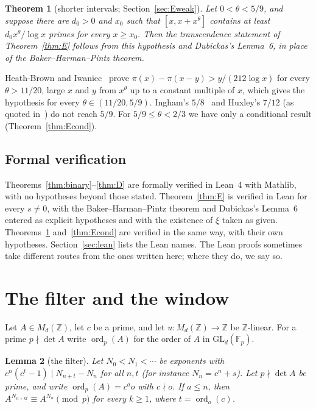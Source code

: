 \documentclass[11pt]{amsart}
\newtheorem{theorem}{Theorem}[section]
\newtheorem{lemma}[theorem]{Lemma}
\theoremstyle{definition}
\newcommand{\Z}{\mathbb{Z}}
\newcommand{\F}{\mathbb{F}}
\newcommand{\GL}{\mathrm{GL}}
\newcommand{\ord}{\operatorname{ord}}
\begin{document}
\begin{theorem}[shorter intervals; Section~\ref{sec:Eweak}]\label{thm:Eweak}
Let $0<\theta<5/9$, and suppose there are $d_0>0$ and $x_0$ such that $[x,x+x^\theta]$ contains at least $d_0x^\theta/\log x$ primes for every $x\ge x_0$.  Then the transcendence statement of Theorem~\ref{thm:E} follows from this hypothesis and Dubickas's Lemma~6, in place of the Baker--Harman--Pintz theorem.
\end{theorem}

Heath-Brown and Iwaniec~\cite{HBI79} prove $\pi(x)-\pi(x-y)>y/(212\log x)$ for every $\theta>11/20$, large $x$ and $y$ from $x^\theta$ up to a constant multiple of $x$, which gives the hypothesis for every $\theta\in(11/20,5/9)$.  Ingham's $5/8$~\cite{Ing37} and Huxley's $7/12$ (as quoted in~\cite{HBI79}) do not reach $5/9$.  For $5/9\le\theta<2/3$ we have only a conditional result (Theorem~\ref{thm:Econd}).

\subsection*{Formal verification}
Theorems~\ref{thm:binary}--\ref{thm:D} are formally verified in Lean~4 with Mathlib, with no hypotheses beyond those stated.  Theorem~\ref{thm:E} is verified in Lean for every $s\neq0$, with the Baker--Harman--Pintz theorem and Dubickas's Lemma~6 entered as explicit hypotheses and with the existence of $\xi$ taken as given.  Theorems~\ref{thm:Eweak} and~\ref{thm:Econd} are verified in the same way, with their own hypotheses.  Section~\ref{sec:lean} lists the Lean names.  The Lean proofs sometimes take different routes from the ones written here; where they do, we say so.

\section{The filter and the window}\label{sec:filter}

Let $A\in M_d(\Z)$, let $c$ be a prime, and let $u:M_d(\Z)\to\Z$ be $\Z$-linear.  For a prime $p\nmid\det A$ write $\ord_p(A)$ for the order of $A$ in $\GL_d(\F_p)$.

\begin{lemma}[the filter]\label{lem:filter}
Let $N_0<N_1<\cdots$ be exponents with $c^{n}(c^{t}-1)\mid N_{n+t}-N_n$ for all $n,t$ (for instance $N_n=c^n+s$).  Let $p\nmid\det A$ be prime, and write $\ord_p(A)=c^a o$ with $c\nmid o$.  If $a\le n$, then $A^{N_{n+kt}}\equiv A^{N_n}\pmod p$ for every $k\ge1$, where $t=\ord_o(c)$.
\end{lemma}
\end{document}
